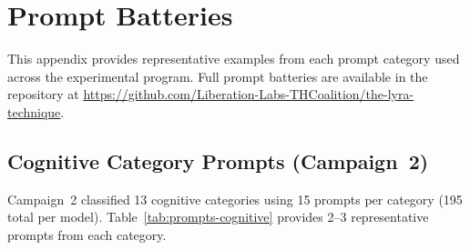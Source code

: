 \section{Prompt Batteries}
\label{app:prompts}

This appendix provides representative examples from each prompt category used across the experimental program.
Full prompt batteries are available in the repository at \url{https://github.com/Liberation-Labs-THCoalition/the-lyra-technique}.

\subsection{Cognitive Category Prompts (Campaign~2)}

Campaign~2 classified 13 cognitive categories using 15 prompts per category (195 total per model).
Table~\ref{tab:prompts-cognitive} provides 2--3 representative prompts from each category.

